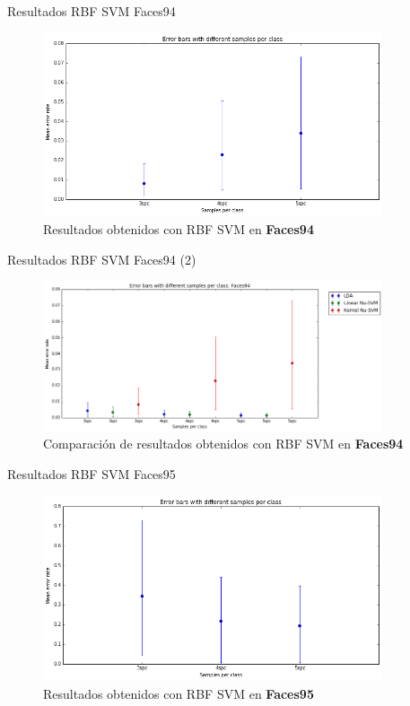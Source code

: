 \documentclass{beamer}
\begin{document}
\begin{frame}{Resultados RBF SVM Faces94}
\begin{figure}[htpb!]
\centering
\includegraphics[width=10cm]{ksvm_res94}
\caption{Resultados obtenidos con RBF SVM en \textbf{Faces94}}
\end{figure}
\end{frame}

\begin{frame}{Resultados RBF SVM Faces94 (2)}
\begin{figure}[htpb!]
\centering
\includegraphics[width=10cm]{ksvm_rescomp94}
\caption{Comparación de resultados obtenidos con RBF SVM en \textbf{Faces94}}
\end{figure}
\end{frame}

\begin{frame}{Resultados RBF SVM Faces95}
\begin{figure}[htpb!]
\centering
\includegraphics[width=10cm]{ksvm_res95}
\caption{Resultados obtenidos con RBF SVM en \textbf{Faces95}}
\end{figure}
\end{frame}
\end{document}
